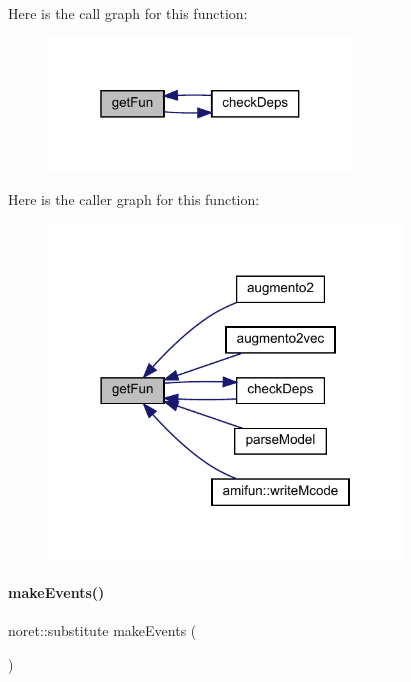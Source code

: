 Here is the call graph for this function\+:
\nopagebreak
\begin{figure}[H]
\begin{center}
\leavevmode
\includegraphics[width=229pt]{classamimodel_a08d58ae650e5ff9310760f6d3f08015c_cgraph}
\end{center}
\end{figure}
Here is the caller graph for this function\+:
\nopagebreak
\begin{figure}[H]
\begin{center}
\leavevmode
\includegraphics[width=266pt]{classamimodel_a08d58ae650e5ff9310760f6d3f08015c_icgraph}
\end{center}
\end{figure}
\mbox{\label{classamimodel_a4d4b20c81af6d7ed977b6b818c7b22db}} 
\paragraph{\texorpdfstring{make\+Events()}{makeEvents()}}
{\footnotesize\ttfamily noret\+::substitute make\+Events (\begin{DoxyParamCaption}{ }\end{DoxyParamCaption})}


